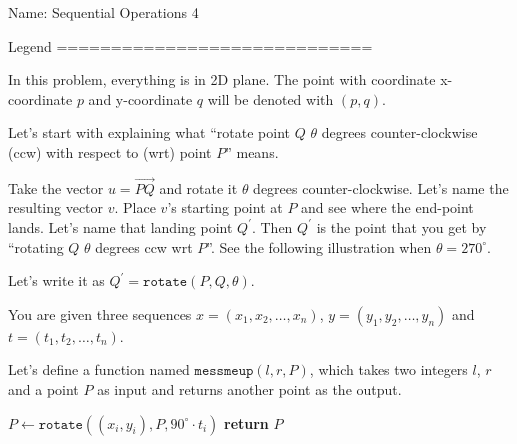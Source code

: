 Name: Sequential Operations 4

Legend
=============================

In this problem, everything is in 2D plane. The point with coordinate
x-coordinate $p$ and y-coordinate $q$ will be denoted with $(p, q)$.

Let's start with explaining what ``rotate point $Q$ $\theta$ degrees
counter-clockwise (ccw) with respect to (wrt) point $P$'' means.

Take the vector $u = \overrightarrow{PQ}$ and rotate it $\theta$
degrees counter-clockwise. Let's name the resulting vector $v$. Place $v$'s
starting point at $P$ and see where the end-point lands. Let's name that
landing point $Q^\prime$. Then $Q^\prime$ is the point that you get by
``rotating $Q$ $\theta$ degrees ccw wrt $P$''. See the following illustration
when $\theta = 270^\circ$.
\begin{center}
\end{center}
Let's write it as $Q^\prime = \texttt{rotate}(P, Q, \theta)$.

You are given three sequences $x = (x_1, x_2, \ldots, x_n)$, $y = (y_1, y_2,
\ldots, y_n)$ and $t = (t_1, t_2, \ldots, t_n)$.

Let's define a function named $\texttt{messmeup}(l, r, P)$, which takes two
integers $l$, $r$ and a point $P$ as input and returns another point as the
output.

\normalem %
\begin{algorithm}[H]
   {
     {
      $P \gets \texttt{rotate}((x_i, y_i), P, 90^\circ \cdot t_i)$\;
    }
    \textbf{return} $P$\;
  }
\end{algorithm}
\ULforem %

